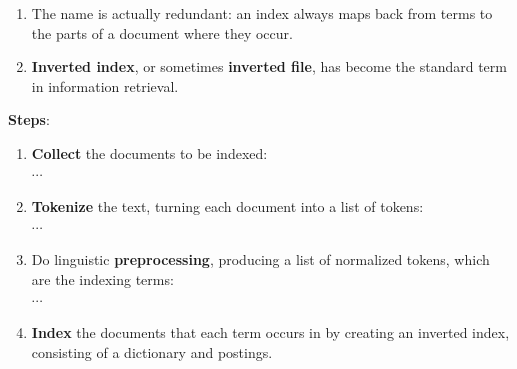 \begin{enumerate}
    \item The name is actually redundant: an index always maps back from terms to the parts of a document where they occur. 
    
    \item \textbf{Inverted index}, or sometimes \textbf{inverted file}, has become the standard term in information retrieval.    
\end{enumerate}


\noindent \textbf{Steps}:
\begin{enumerate}
    \item \textbf{Collect} the documents to be indexed:\\
      $\cdots$

    \vspace{0.5cm}
    \item \textbf{Tokenize} the text, turning each document into a list of tokens:\\
             $\cdots$

    \vspace{0.5cm}
    \item Do linguistic \textbf{preprocessing}, producing a list of normalized tokens, which are the indexing terms:\\
        $\cdots$

    \vspace{0.5cm}
    \item \textbf{Index} the documents that each term occurs in by creating an inverted index, consisting of a dictionary and postings.
\end{enumerate}


